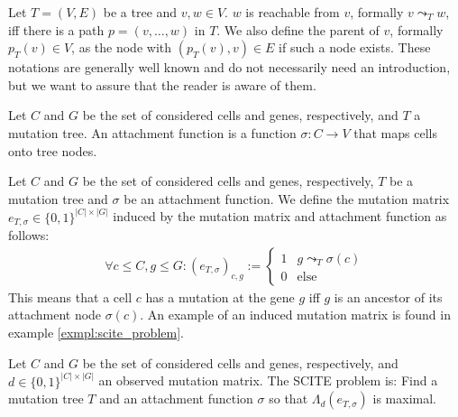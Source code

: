 \begin{definition}
    \label{def:reachability}
    Let $T = (V, E)$ be a tree and $v, w \in V$. $w$ is reachable from $v$, formally $v \leadsto_T w$, iff there is a path $p = (v, \dots, w)$ in $T$. We also define the parent of $v$, formally $p_T(v) \in V$, as the node with $(p_T(v), v) \in E$ if such a node exists. These notations are generally well known and do not necessarily need an introduction, but we want to assure that the reader is aware of them.
\end{definition}

\begin{definition}
    \label{def:attachment}
    Let $C$ and $G$ be the set of considered cells and genes, respectively, and $T$ a mutation tree. An attachment function is a function $\sigma: C \rightarrow V$ that maps cells onto tree nodes.
\end{definition}

\begin{definition}
    \label{def:induced_mutmatrix}
    Let $C$ and $G$ be the set of considered cells and genes, respectively, $T$ be a mutation tree and $\sigma$ be an attachment function. We define the mutation matrix $e_{T, \sigma} \in \{0,1\}^{|C| \times |G|}$ induced by the mutation matrix and attachment function as follows:
    \begin{align*}
        \forall c \leq C, g \leq G: (e_{T, \sigma})_{c,g} := \begin{cases}
            1 & g \leadsto_T \sigma(c) \\
            0 & \mathrm{else}
        \end{cases}
    \end{align*}
    This means that a cell $c$ has a mutation at the gene $g$ iff $g$ is an ancestor of its attachment node $\sigma(c)$. An example of an induced mutation matrix is found in example \ref{exmpl:scite_problem}.
\end{definition}

\begin{definition}
    \label{def:scite_problem}
    Let $C$ and $G$ be the set of considered cells and genes, respectively, and $d \in \{0,1\}^{|C| \times |G|}$ an observed mutation matrix. The \ac{SCITE} problem is: Find a mutation tree $T$ and an attachment function $\sigma$ so that $\Lambda_d(e_{T, \sigma})$ is maximal.
\end{definition}

